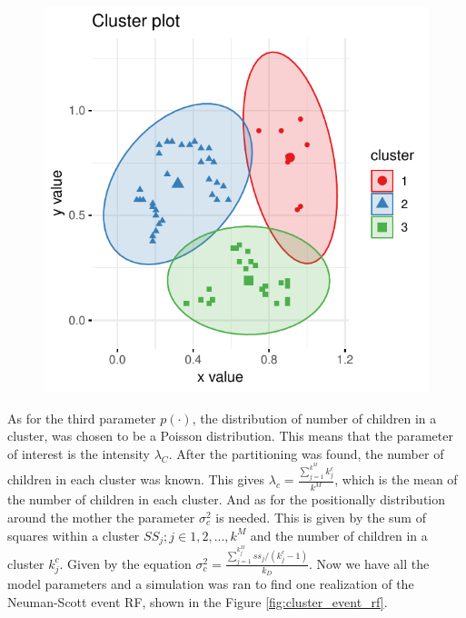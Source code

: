 \begin{figure}
    \centering
    \includegraphics[scale=0.95]{figures/redwood_cluster_partitioning.pdf}
    \caption{}
    \label{fig:cluster_part}
\end{figure}
As for the third parameter $p(\cdot)$, the distribution of number of children in a cluster, was chosen to be a Poisson distribution. This means that the parameter of interest is the intensity $\lambda_C$. After the partitioning was found, the number of children in each cluster was known. This gives $\lambda_c = \frac{\sum\limits_{j = 1} ^{k^M} k_j^c}{k^M}$, which is the mean of the number of children in each cluster. And as for the positionally distribution around the mother the parameter $\sigma_c^2$ is needed. This is given by the sum of squares within a cluster $SS_j; j\in 1,2,...,k^M$ and the number of children in a cluster $k_j^c$. Given by the equation $\sigma_c^2 = \frac{\sum\limits_{j = 1}^{k_j^M}ss_j/(k_j^c-1)}{k_D}$. Now we have all the model parameters and a simulation was ran to find one realization of the Neuman-Scott event RF, shown in the Figure \ref{fig:cluster_event_rf}.
